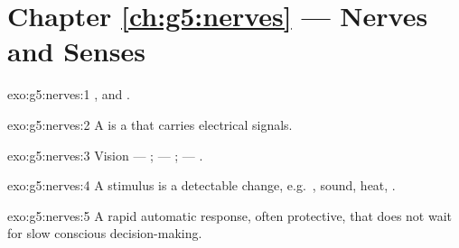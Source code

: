 \section*{Chapter \ref{ch:g5:nerves} --- Nerves and Senses}

\begin{solution}{exo:g5:nerves:1}
,  and .
\end{solution}

\begin{solution}{exo:g5:nerves:2}
A  is a   that carries electrical signals.
\end{solution}

\begin{solution}{exo:g5:nerves:3}
Vision --- ;  --- ;  --- .
\end{solution}

\begin{solution}{exo:g5:nerves:4}
A stimulus is a detectable change, e.g.\ , sound, heat, .
\end{solution}

\begin{solution}{exo:g5:nerves:5}
A rapid automatic response, often protective, that does not wait for
slow conscious decision-making.
\end{solution}


